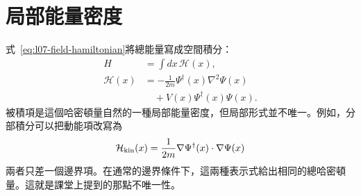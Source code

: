 \begin{classroomqa}
\end{classroomqa}

\section{局部能量密度}

式~\eqref{eq:l07-field-hamiltonian}將總能量寫成空間積分：
\begin{equation}
\begin{aligned}
H&=\int dx\,\mathcal H(x),\\
\mathcal H(x)
&=-\frac{1}{2m}\Psi^\dagger(x)\nabla^2\Psi(x)\\
&\quad+V(x)\Psi^\dagger(x)\Psi(x).
\end{aligned}
\label{eq:l07-hamiltonian-density}
\end{equation}
被積項是這個哈密頓量自然的一種局部能量密度，但局部形式並不唯一。例如，分部積分可以把動能項改寫為
\begin{equation}
\mathcal H_{\rm kin}(x)
=\frac{1}{2m}\nabla\Psi^\dagger(x)\mathbin{\cdot}\nabla\Psi(x)
\label{eq:l07-kinetic-density}
\end{equation}
兩者只差一個邊界項。在通常的邊界條件下，這兩種表示式給出相同的總哈密頓量。這就是課堂上提到的那點不唯一性。

\begin{classroomqa}
\end{classroomqa}

\begin{classroomqa}
\end{classroomqa}

\begin{classroomqa}
\end{classroomqa}

